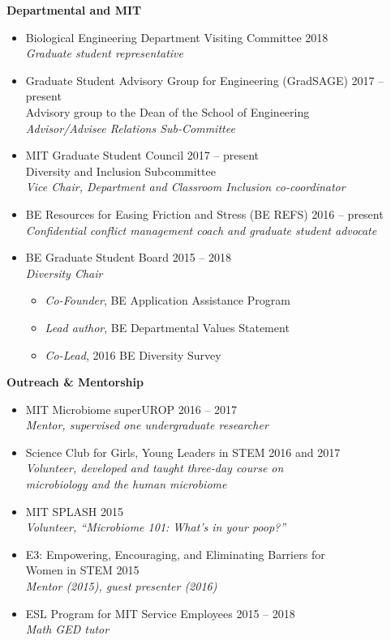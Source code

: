 \documentclass[10pt]{article}
\newenvironment{outerlist}[1][\enskip\textbullet]%
        {\begin{itemize}[#1,leftmargin=*]}{\end{itemize}%
         \vspace{-.6\baselineskip}}
\newenvironment{innerlist}[1][\enskip\textbullet]%
        {\begin{itemize}[#1,leftmargin=*,parsep=0pt,itemsep=0pt,topsep=0pt,partopsep=0pt]}
        {\end{itemize}}
\begin{document}
\textbf{Departmental and MIT}
\begin{outerlist}
	\item[] Biological Engineering Department Visiting Committee \hfill {2018} \\
	\textit{Graduate student representative}
	\item[] Graduate Student Advisory Group for Engineering (GradSAGE) \hfill {2017 -- present} \\
	Advisory group to the Dean of the School of Engineering \\
	\textit{Advisor/Advisee Relations Sub-Committee}
	\item[] MIT Graduate Student Council \hfill {2017 -- present} \\
		Diversity and Inclusion Subcommittee  \\
		\textit{Vice Chair, Department and Classroom Inclusion co-coordinator} 
	\item[] BE Resources for Easing Friction and Stress (BE REFS) \hfill {2016 -- present} \\
	\textit{Confidential conflict management coach and graduate student advocate}
	\item[] BE Graduate Student Board \hfill {2015 -- 2018} \\ 
		\textit{Diversity Chair} 
		\begin{innerlist}
			\item[] \textit{Co-Founder}, BE Application Assistance Program 
			\item[] \textit{Lead author}, BE Departmental Values Statement 
			\item[] \textit{Co-Lead}, 2016 BE Diversity Survey
		\end{innerlist}
\end{outerlist}
\vspace{.15in}

\textbf{Outreach \& Mentorship}
\begin{outerlist}
	\item[] MIT Microbiome superUROP \hfill {2016 -- 2017} \\
	\textit{Mentor, supervised one undergraduate researcher}
	\item[] Science Club for Girls, Young Leaders in STEM \hfill {2016 and 2017} \\ \textit{Volunteer, developed and taught three-day course on} \\ \textit{microbiology and the human microbiome} 
	\item[] MIT SPLASH \hfill 2015 \\
	\textit{Volunteer, ``Microbiome 101: What's in your poop?''}
	\item[] E3: Empowering, Encouraging, and Eliminating Barriers for \\ Women in STEM \hfill 2015 \\
	\textit{Mentor (2015), guest presenter (2016)}
	\item[] ESL Program for MIT Service Employees \hfill {2015 -- 2018} \\
	\textit{Math GED tutor}
\end{outerlist}
\vspace{.15in}
\end{document}

